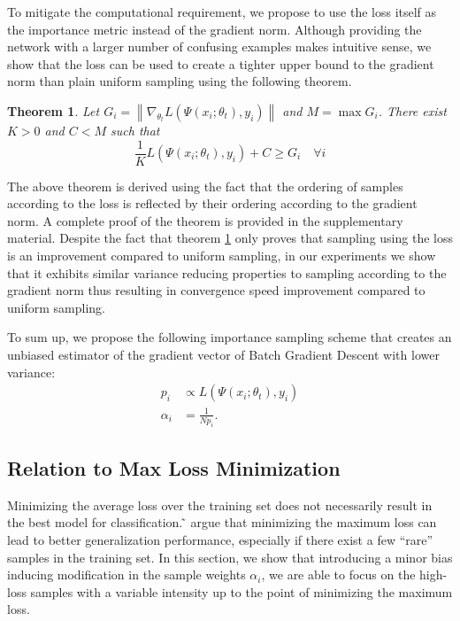 \documentclass{article}
\newcommand{\citet}[1]{\citeauthor{#1} ̃\shortcite{#1}}
\newcommand{\norm}[1]{\left\lVert #1 \right\rVert}
\newtheorem{theorem}{Theorem}
\begin{document}
To mitigate the computational requirement, we propose to use the loss itself as
the importance metric instead of the gradient norm. Although providing the
network with a larger number of confusing examples makes intuitive sense, we
show that the loss can be used to create a tighter upper bound to the gradient
norm than plain uniform sampling using the following theorem.

\begin{theorem} \label{the:loss_upper_bound}
Let $G_i = \norm{\nabla_{\theta_t} L(\Psi(x_i; \theta_t), y_i)}$ and $M = \max
G_i$. There exist $K > 0$ and $C < M$ such that
\begin{equation}
\frac{1}{K} L(\Psi(x_i; \theta_t), y_i) + C \geq G_i \quad \forall i
\end{equation}
\end{theorem}

The above theorem is derived using the fact that the ordering of samples
according to the loss is reflected by their ordering according to the gradient
norm. A complete proof of the theorem is provided in the supplementary
material. Despite the fact that theorem \ref{the:loss_upper_bound} only proves
that sampling using the loss is an improvement compared to uniform sampling, in
our experiments we show that it exhibits similar variance reducing properties
to sampling according to the gradient norm thus resulting in convergence speed
improvement compared to uniform sampling.

To sum up, we propose the following importance sampling scheme that
creates an unbiased estimator of the gradient vector of Batch Gradient
Descent with lower variance:
%
\begin{align}
    p_i      & \propto L(\Psi(x_i; \theta_t), y_i) \\
    \alpha_i & = \frac{1}{N p_i}.
\end{align}

\subsection{Relation to Max Loss Minimization} \label{sec:max_loss_theory}

Minimizing the average loss over the training set does not necessarily result
in the best model for classification. \citet{shalev2016minimizing} argue that
minimizing the maximum loss can lead to better generalization performance,
especially if there exist a few ``rare'' samples in the training set.
In this section, we show that introducing a minor bias inducing modification in
the sample weights $\alpha_i$, we are able to focus on the high-loss samples
with a variable intensity up to the point of minimizing the maximum loss.
\end{document}
